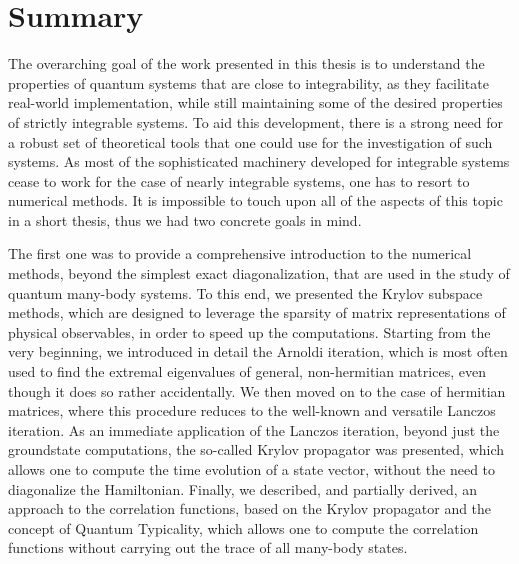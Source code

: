\chapter{Summary}
\thispagestyle{chapterBeginStyle}


The overarching goal of the work presented in this thesis is to understand the properties of
quantum systems that are close to integrability, as they facilitate real-world implementation, while
still maintaining some of the desired properties of strictly integrable systems.
To aid this development, there is a strong need for a robust set of theoretical tools that one
could use for the investigation of such systems. As most of the sophisticated machinery developed
for integrable systems cease to work for the case of nearly integrable systems, one has
to resort to numerical methods. It is impossible to touch upon all of the aspects of this
topic in a short thesis, thus we had two concrete goals in mind.

The first one was to provide a comprehensive introduction to the numerical methods, beyond the simplest exact
diagonalization, that are used in the study of quantum many-body systems. To this end, we presented
the Krylov subspace methods, which are designed to leverage the sparsity of matrix representations of
physical observables, in order to speed up the computations. Starting from the very beginning, we 
introduced in detail the Arnoldi iteration, which is most often used to find the extremal eigenvalues
of general, non-hermitian matrices, even though it does so rather accidentally. We then moved on to
the case of hermitian matrices, where this procedure reduces to the well-known and versatile
Lanczos iteration. As an immediate application of the Lanczos iteration, beyond just the groundstate
computations, the so-called Krylov propagator was presented, which allows one to compute the time evolution of
a state vector, without the need to diagonalize the Hamiltonian. Finally, we described,
and partially derived, an approach to the correlation functions, based on the Krylov
propagator and the concept of Quantum Typicality, which allows one to compute the correlation functions
without carrying out the trace of all many-body states.

